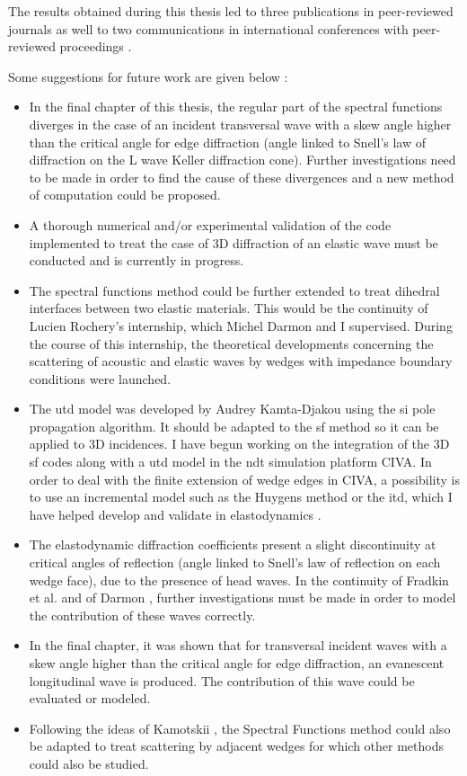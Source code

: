 The results obtained during this thesis led to three publications in peer-reviewed journals \cite{article, articleelasto, articleITD} as well to two communications in international conferences with peer-reviewed proceedings \cite{DD2018,AFPAC}.

Some suggestions for future work are given below :
\begin{itemize}
\item In the final chapter of this thesis, the regular part of the spectral functions diverges in the case of an incident transversal wave with a skew angle higher than the critical angle for edge diffraction (angle linked to Snell's law of diffraction on the L wave Keller diffraction cone). Further investigations need to be made in order to find the cause of these divergences and a new method of computation could be proposed.
\item A thorough numerical and/or experimental validation of the code implemented to treat the case of 3D diffraction of an elastic wave must be conducted and is currently in progress.
\item The spectral functions method could be further extended to treat dihedral interfaces between two elastic materials. This would be the continuity of Lucien Rochery's internship, which Michel Darmon and I supervised. During the course of this internship, the theoretical developments concerning the scattering of acoustic and elastic waves by wedges with impedance boundary conditions were launched.
\item The \acrshort{utd} model was developed by Audrey Kamta-Djakou \cite{AKDthese} using the \acrfull{si} pole propagation algorithm. It should be adapted to the \acrshort{sf} method so it can be applied to 3D incidences. I have begun working on the integration of the 3D \acrshort{sf} codes along with a \acrshort{utd} model in the \acrshort{ndt} simulation platform CIVA. In order to deal with the finite extension of wedge edges in CIVA, a possibility is to use an incremental model such as the Huygens method or the \acrfull{itd}, which I have helped develop and validate in elastodynamics \cite{articleITD}.
\item The elastodynamic diffraction coefficients present a slight discontinuity at critical angles of reflection (angle linked to Snell's law of reflection on each wedge face), due to the presence of head waves. In the continuity of Fradkin et al. \cite{FradkinDarmon} and of Darmon \cite{HDRMichel}, further investigations must be made in order to model the contribution of these waves correctly.
\item In the final chapter, it was shown that for transversal incident waves with a skew angle higher than the critical angle for edge diffraction, an evanescent longitudinal wave is produced. The contribution of this wave could be evaluated or modeled.
\item Following the ideas of Kamotskii \cite{Kamotski2}, the Spectral Functions method could also be adapted to treat scattering by adjacent wedges for which other methods \cite{Bernardpoly,BorovikovKinber} could also be studied.
\end{itemize}